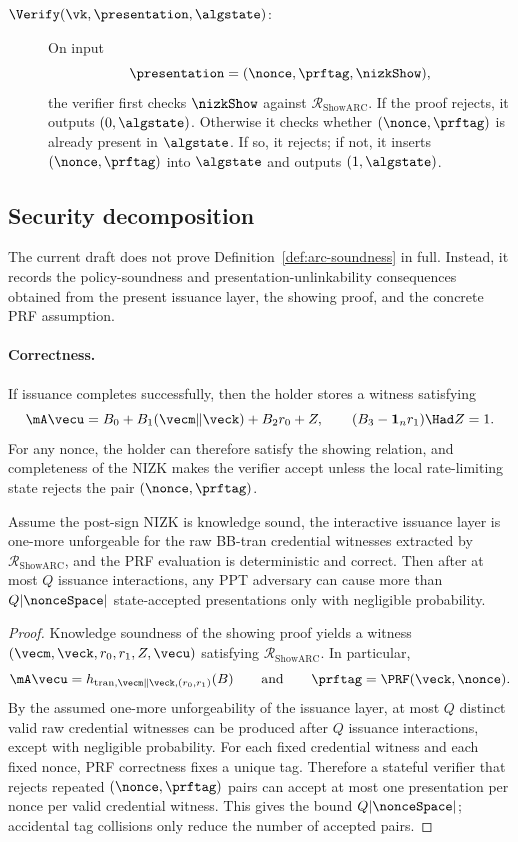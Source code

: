 \begin{description}
\item[$\Verify(\vk,\presentation,\algstate)$:] On input
\[
  \presentation=(\nonce,\prftag,\nizkShow),
\]
the verifier first checks $\nizkShow$ against $\mathcal R_{\mathrm{ShowARC}}$.  If the proof rejects, it outputs
$(0,\algstate)$.  Otherwise it checks whether $(\nonce,\prftag)$ is already present in $\algstate$.  If so, it
rejects; if not, it inserts $(\nonce,\prftag)$ into $\algstate$ and outputs $(1,\algstate)$.
\end{description}

\subsection{Security decomposition}
The current draft does not prove Definition~\ref{def:arc-soundness} in full.  Instead, it records the policy-soundness
and presentation-unlinkability consequences obtained from the present issuance layer, the showing proof, and the
concrete PRF assumption.

\paragraph{Correctness.}
If issuance completes successfully, then the holder stores a witness satisfying
\[
  \mA\vecu=B_0+B_1(\vecm\Vert\veck)+B_2r_0+Z,
  \qquad
  (B_3-\mathbf 1_n r_1)\Had Z=1.
\]
For any nonce, the holder can therefore satisfy the showing relation, and completeness of the NIZK makes the
verifier accept unless the local rate-limiting state rejects the pair $(\nonce,\prftag)$.

\begin{proposition}\label{prop:arc-policy-soundness}
Assume the post-sign NIZK is knowledge sound, the interactive issuance layer is one-more unforgeable for
the raw BB-tran credential witnesses extracted by $\mathcal R_{\mathrm{ShowARC}}$, and the PRF evaluation is
deterministic and correct.  Then after at most $Q$ issuance interactions, any PPT adversary can cause more
than $Q|\nonceSpace|$ state-accepted presentations only with negligible probability.
\end{proposition}

\begin{proof}
Knowledge soundness of the showing proof yields a witness
$(\vecm,\veck,r_0,r_1,Z,\vecu)$ satisfying $\mathcal R_{\mathrm{ShowARC}}$.  In particular,
\[
  \mA\vecu=h_{\mathrm{tran},\vecm\Vert\veck,(r_0,r_1)}(B)
  \qquad\text{and}\qquad
  \prftag=\PRF(\veck,\nonce).
\]
By the assumed one-more unforgeability of the issuance layer, at most $Q$ distinct valid raw credential
witnesses can be produced after $Q$ issuance interactions, except with negligible probability.  For each fixed
credential witness and each fixed nonce, PRF correctness fixes a unique tag.  Therefore a stateful verifier that
rejects repeated $(\nonce,\prftag)$ pairs can accept at most one presentation per nonce per valid credential
witness.  This gives the bound $Q|\nonceSpace|$; accidental tag collisions only reduce the number of accepted
pairs.
\end{proof}

